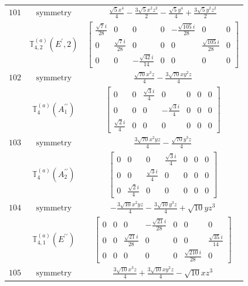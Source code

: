 \documentclass[fleqn,8pt,landscape]{jsarticle}
\begin{document}
\begin{longtable}{ccc}
$ 101 $ & $ \text{symmetry} $ & $ \frac{\sqrt{5} x^{4}}{4} - \frac{3 \sqrt{5} x^{2} z^{2}}{2} - \frac{\sqrt{5} y^{4}}{4} + \frac{3 \sqrt{5} y^{2} z^{2}}{2} $ \\
$  $ & $ \mathbb{T}_{4,2}^{(a)}(E^{\prime},2) $ & $ \begin{bmatrix} \frac{\sqrt{7} i}{28} & 0 & 0 & 0 & - \frac{\sqrt{105} i}{28} & 0 & 0 \\ 0 & \frac{\sqrt{7} i}{28} & 0 & 0 & 0 & \frac{\sqrt{105} i}{28} & 0 \\ 0 & 0 & - \frac{\sqrt{42} i}{14} & 0 & 0 & 0 & 0 \end{bmatrix} $ \\ \hline
$ 102 $ & $ \text{symmetry} $ & $ \frac{\sqrt{70} x^{3} z}{4} - \frac{3 \sqrt{70} x y^{2} z}{4} $ \\
$  $ & $ \mathbb{T}_{4}^{(a)}(A_{1}^{\prime\prime}) $ & $ \begin{bmatrix} 0 & 0 & \frac{\sqrt{3} i}{4} & 0 & 0 & 0 & 0 \\ 0 & 0 & 0 & - \frac{\sqrt{3} i}{4} & 0 & 0 & 0 \\ \frac{\sqrt{2} i}{4} & 0 & 0 & 0 & 0 & 0 & 0 \end{bmatrix} $ \\ \hline
$ 103 $ & $ \text{symmetry} $ & $ \frac{3 \sqrt{70} x^{2} y z}{4} - \frac{\sqrt{70} y^{3} z}{4} $ \\
$  $ & $ \mathbb{T}_{4}^{(a)}(A_{2}^{\prime\prime}) $ & $ \begin{bmatrix} 0 & 0 & 0 & \frac{\sqrt{3} i}{4} & 0 & 0 & 0 \\ 0 & 0 & \frac{\sqrt{3} i}{4} & 0 & 0 & 0 & 0 \\ 0 & \frac{\sqrt{2} i}{4} & 0 & 0 & 0 & 0 & 0 \end{bmatrix} $ \\ \hline
$ 104 $ & $ \text{symmetry} $ & $ - \frac{3 \sqrt{10} x^{2} y z}{4} - \frac{3 \sqrt{10} y^{3} z}{4} + \sqrt{10} y z^{3} $ \\
$  $ & $ \mathbb{T}_{4,1}^{(a)}(E^{\prime\prime}) $ & $ \begin{bmatrix} 0 & 0 & 0 & - \frac{\sqrt{21} i}{28} & 0 & 0 & 0 \\ 0 & 0 & \frac{\sqrt{21} i}{28} & 0 & 0 & 0 & \frac{\sqrt{35} i}{14} \\ 0 & 0 & 0 & 0 & 0 & \frac{\sqrt{210} i}{28} & 0 \end{bmatrix} $ \\ \hline
$ 105 $ & $ \text{symmetry} $ & $ \frac{3 \sqrt{10} x^{3} z}{4} + \frac{3 \sqrt{10} x y^{2} z}{4} - \sqrt{10} x z^{3} $ \\

\end{longtable}
\end{document}
